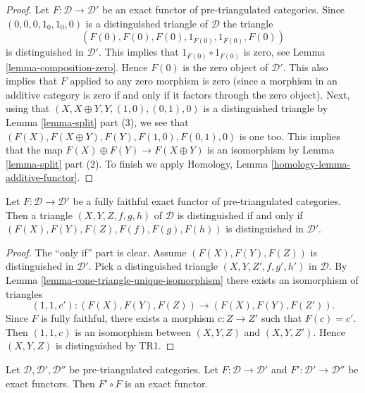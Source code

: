 \begin{proof}
Let $F : \mathcal{D} \to \mathcal{D}'$ be an exact functor of
pre-triangulated categories. Since
$(0, 0, 0, 1_0, 1_0, 0)$ is a distinguished triangle of $\mathcal{D}$
the triangle
$$
(F(0), F(0), F(0), 1_{F(0)}, 1_{F(0)}, F(0))
$$
is distinguished in $\mathcal{D}'$.
This implies that $1_{F(0)} \circ 1_{F(0)}$ is zero, see
Lemma \ref{lemma-composition-zero}.
Hence $F(0)$ is the zero object of $\mathcal{D}'$. This also implies
that $F$ applied to any zero morphism is zero (since a morphism in
an additive category is zero if and only if it factors through the
zero object). Next, using that
$(X, X \oplus Y, Y, (1, 0), (0, 1), 0)$ is a distinguished triangle by
Lemma \ref{lemma-split} part (3), we see that
$(F(X), F(X \oplus Y), F(Y), F(1, 0), F(0, 1), 0)$ is
one too. This implies that the map $F(X) \oplus F(Y) \to F(X \oplus Y)$
is an isomorphism by Lemma \ref{lemma-split} part (2). To finish we apply
Homology, Lemma \ref{homology-lemma-additive-functor}.
\end{proof}

\begin{lemma}
\label{lemma-exact-equivalence}
Let $F : \mathcal{D} \to \mathcal{D}'$ be a fully faithful exact functor
of pre-triangulated categories. Then a triangle $(X, Y, Z, f, g, h)$
of $\mathcal{D}$ is distinguished if and only if
$(F(X), F(Y), F(Z), F(f), F(g), F(h))$ is distinguished in $\mathcal{D}'$.
\end{lemma}

\begin{proof}
The ``only if'' part is clear. Assume $(F(X), F(Y), F(Z))$ is
distinguished in $\mathcal{D}'$. Pick a distinguished triangle
$(X, Y, Z', f, g', h')$ in $\mathcal{D}$. By
Lemma \ref{lemma-cone-triangle-unique-isomorphism}
there exists an isomorphism of triangles
$$
(1, 1, c') : (F(X), F(Y), F(Z)) \longrightarrow (F(X), F(Y), F(Z')).
$$
Since $F$ is fully faithful, there exists a morphism $c : Z \to Z'$
such that $F(c) = c'$. Then $(1, 1, c)$ is an isomorphism between
$(X, Y, Z)$ and $(X, Y, Z')$. Hence $(X, Y, Z)$ is distinguished
by TR1.
\end{proof}

\begin{lemma}
\label{lemma-composition-exact}
Let $\mathcal{D}, \mathcal{D}', \mathcal{D}''$ be pre-triangulated categories.
Let $F : \mathcal{D} \to \mathcal{D}'$ and
$F' : \mathcal{D}' \to \mathcal{D}''$ be exact functors.
Then $F' \circ F$ is an exact functor.
\end{lemma}


